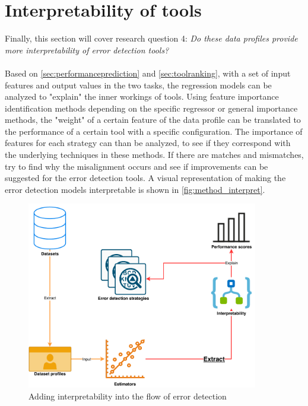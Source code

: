 \newpage
\section{Interpretability of tools}
\label{sec:interpretabilityoftools}
Finally, this section will cover research question 4: \textit{Do these data profiles provide more interpretability of error detection tools?}
~\\~\\Based on \autoref{sec:performanceprediction} and \autoref{sec:toolranking}, with a set of input features and output values in the two tasks, the regression models can be analyzed to "explain" the inner workings of tools. Using feature importance identification methods depending on the specific regressor or general importance methods, the "weight" of a certain feature of the data profile can be translated to the performance of a certain tool with a specific configuration. The importance of features for each strategy can than be analyzed, to see if they correspond with the underlying techniques in these methods. If there are matches and mismatches, try to find why the misalignment occurs and see if improvements can be suggested for the error detection tools. A visual representation of making the error detection models interpretable is shown in \autoref{fig:method_interpret}.

\begin{figure}[h]
    \centering
    \includegraphics[width=0.9\textwidth]{thesis/Figures/Method/PerformanceEstimation-Interpretability.pdf}
    \caption{Adding interpretability into the flow of error detection}
    \label{fig:method_interpret}
\end{figure}


